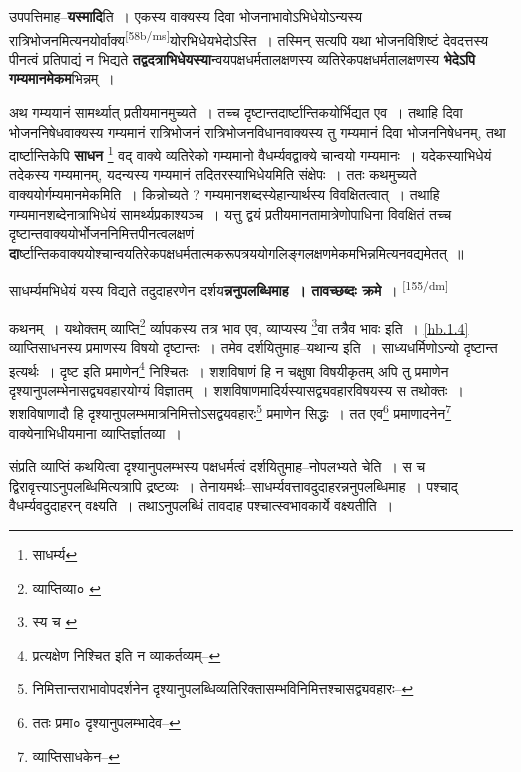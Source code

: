 \documentclass[article,12pt,a4paper]{memoir}
\begin{document}
	  \pstart उपपत्तिमाह--\textbf{यस्मादि}ति । एकस्य वाक्यस्य दिवा भोजनाभावोऽभिधेयोऽन्यस्य रात्रिभोजनमित्यनयोर्वाक्य\leavevmode\textsuperscript{\rmlatinfont\tiny [58b/ms]}योरभिधेयभेदोऽस्ति । तस्मिन् सत्यपि यथा भोजनविशिष्टं देवदत्तस्य पीनत्वं प्रतिपाद्यं न भिद्यते \textbf{तद्वदत्राभिधेयस्या}न्वयपक्षधर्मतालक्षणस्य व्यतिरेकपक्षधर्मतालक्षणस्य \textbf{भेदेऽपि गम्यमानमेकम}भिन्नम् ।
	\pend
      

	  \pstart अथ गम्ययानं सामर्थ्यात् प्रतीयमानमुच्यते । तच्च दृष्टान्तदार्ष्टान्तिकयोर्भिद्यत एव । तथाहि दिवा भोजननिषेधवाक्यस्य गम्यमानं रात्रिभोजनं रात्रिभोजनविधानवाक्यस्य तु गम्यमानं दिवा भोजननिषेधनम्, तथा दार्ष्टान्तिकेपि \textbf{साधन} \footnote{साधर्म्य} वद् वाक्ये व्यतिरेको गम्यमानो वैधर्म्यवद्वाक्ये चान्वयो गम्यमानः । यदेकस्याभिधेयं तदेकस्य गम्यमानम्, यदन्यस्य गम्यमानं तदितरस्याभिधेयमिति संक्षेपः । ततः कथमुच्यते वाक्ययोर्गम्यमानमेकमिति । किन्नोच्यते ? गम्यमानशब्दस्येहान्यार्थस्य विवक्षितत्वात् । तथाहि गम्यमानशब्देनात्राभिधेयं सामर्थ्यप्रकाश्यञ्च । यत्तु द्वयं प्रतीयमानतामात्रेणोपाधिना विवक्षितं तच्च दृष्टान्तवाक्ययोर्भोजननिमित्तपीनत्वलक्षणं \textbf{दा}र्ष्टान्तिकवाक्ययोश्चान्वयतिरेकपक्षधर्मतात्मकरूपत्रययोगलिङ्गलक्षणमेकमभिन्नमित्यनवद्यमेतत् ॥
	\pend
      

	  \pstart साधर्म्यमभिधेयं यस्य विद्यते तदुदाहरणेन दर्शय\textbf{न्ननुपलब्धिमाह । तावच्छब्दः क्रमे} ।  \leavevmode\textsuperscript{\rmlatinfont\tiny [155/dm]} 
	  
	कथनम् । यथोक्तम् व्याप्ति\footnote{व्याप्तिव्या० \cite{dp-msA}} र्व्यापकस्य तत्र भाव एव, व्याप्यस्य \footnote{स्य च \cite{dp-msB} \cite{dp-msC} \cite{dp-msD} \cite{dp-edP} \cite{dp-edH} \cite{dp-edE} \cite{dp-edN}}वा तत्रैव भावः इति । \cref{hb.1.4} व्याप्तिसाधनस्य प्रमाणस्य विषयो दृष्टान्तः । तमेव दर्शयितुमाह--यथान्य इति । साध्यधर्मिणोऽन्यो दृष्टान्त इत्यर्थः । दृष्ट इति प्रमाणेन\footnote{प्रत्यक्षेण निश्चित इति न व्याकर्तव्यम्--\cite{dp-msD-n}} निश्चितः । शशविषाणं हि न चक्षुषा विषयीकृतम् अपि तु प्रमाणेन दृश्यानुपलम्भेनासद्व्यवहारयोग्यं विज्ञातम् । शशविषाणमादिर्यस्यासद्व्यवहारविषयस्य स तथोक्तः । शशविषाणादौ हि दृश्यानुपलम्भमात्रनिमित्तोऽसद्वयवहारः\footnote{निमित्तान्तराभावोपदर्शनेन दृश्यानुपलब्धिव्यतिरिक्तासम्भविनिमित्तश्चासद्व्यवहारः--\cite{dp-msD-n}} प्रमाणेन सिद्धः । तत एव\footnote{ततः प्रमा० \cite{dp-msC} दृश्यानुपलम्भादेव--\cite{dp-msD-n}} प्रमाणादनेन\footnote{व्याप्तिसाधकेन--\cite{dp-msD-n}} वाक्येनाभिधीयमाना व्याप्तिर्ज्ञातव्या । 
	  
	संप्रति व्याप्तिं कथयित्वा दृश्यानुपलम्भस्य पक्षधर्मत्वं दर्शयितुमाह--नोपलभ्यते चेति । स च द्विरावृत्त्याऽनुपलब्धिमित्यत्रापि द्रष्टव्यः । तेनायमर्थः--साधर्म्यवत्तावदुदाहरन्ननुपलब्धिमाह । पश्चाद् वैधर्म्यवदुदाहरन् वक्ष्यति । तथाऽनुपलब्धिं तावदाह पश्चात्स्वभावकार्ये वक्ष्यतीति ।
	\pend
      
\end{document}
